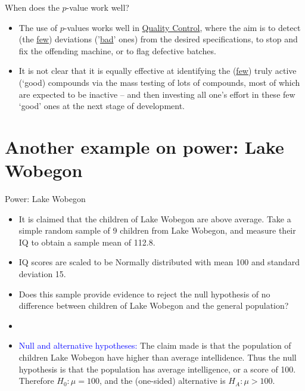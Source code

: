 \documentclass[10pt]{beamer}\usepackage[]{graphicx}\usepackage[]{color}
\begin{document}
\begin{frame}{When does the $p$-value work well?}
	\begin{itemize}
		\small
		\setlength\itemsep{1em}
		\item The use of $p$-values works well in \underline{Quality Control}, where the aim is to detect
		(the \underline{few})  deviations ('\underline{bad}' ones)  from the desired specifications, to stop and fix	the offending machine, or to flag defective batches. \pause 
		\item It is not clear that it is equally effective at identifying the (\underline{few}) truly active (`{good}) compounds	via the mass testing of lots of compounds, most of which are expected to be inactive -- and then investing all one's effort in these few `good' ones at the next stage of development.
	\end{itemize}
\end{frame}


\section{Another example on power: Lake Wobegon}

\begin{frame}[fragile]{Power: Lake Wobegon}
	\small
	\begin{itemize}
		\item It is claimed that the children of Lake Wobegon are above
		average. Take a simple random sample of 9 children from Lake
		Wobegon, and measure their IQ to obtain a sample mean of 112.8. 
		\item IQ scores are scaled to be Normally distributed with mean 100 and
		standard deviation 15. 
		\item Does this sample provide evidence to reject the null hypothesis of no difference between children of Lake Wobegon and the general population? \pause 
		\item[]\item[1.] \textcolor{blue}{Null and alternative hypotheses:} The claim made is
		that the population of children Lake Wobegon have higher than
		average intellidence. Thus the null hypothesis is that the
		population has average intelligence, or a score of 100. Therefore
		$H_0: \mu=100$, and the (one-sided) alternative is $H_A: \mu >
		100$.
	\end{itemize}
\end{frame}
\end{document}
